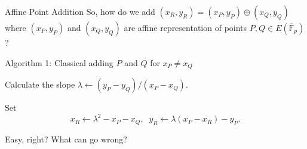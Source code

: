\documentclass{zkdl-presentation-template}
\begin{document}
    \begin{frame}{Affine Point Addition}
        So, how do we add $(x_R,y_R) = (x_P,y_P) \oplus (x_Q,y_Q)$ where $(x_P,y_P)$ and $(x_Q,y_Q)$ are affine representation of points $P,Q \in E(\overline{\mathbb{F}}_p)$?
        \pause
        \begin{block}{Algorithm 1: Classical adding $P$ and $Q$ for $x_P \neq x_Q$}
        \begin{algoen}
           \item Calculate the slope $
                \lambda \gets (y_P-y_Q)/(x_P-x_Q)$. \pause
           \item Set
           \begin{equation*}
           x_R \gets \lambda^2 - x_P - x_Q, \;\; y_R \gets \lambda(x_P - x_R) - y_P.
           \end{equation*}
        \end{algoen}
        \end{block}

        Easy, right? What can go wrong?
    \end{frame}
\end{document}
